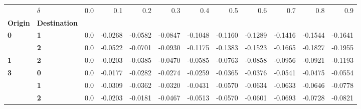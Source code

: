 \begin{tabular}{llrrrrrrrrrr}
\toprule
    & \textbf{\(\delta\)} &  0.0 &     0.1 &     0.2 &     0.3 &     0.4 &     0.5 &     0.6 &     0.7 &     0.8 &     0.9 \\
\textbf{Origin} & \textbf{Destination} &      &         &         &         &         &         &         &         &         &         \\
\midrule
\textbf{0} & \textbf{1} &  0.0 & -0.0268 & -0.0582 & -0.0847 & -0.1048 & -0.1160 & -0.1289 & -0.1416 & -0.1544 & -0.1641 \\
  & \textbf{2} &  0.0 & -0.0522 & -0.0701 & -0.0930 & -0.1175 & -0.1383 & -0.1523 & -0.1665 & -0.1827 & -0.1955 \\
\textbf{1} & \textbf{2} &  0.0 & -0.0203 & -0.0385 & -0.0470 & -0.0585 & -0.0763 & -0.0858 & -0.0956 & -0.0921 & -0.1193 \\
\textbf{3} & \textbf{0} &  0.0 & -0.0177 & -0.0282 & -0.0274 & -0.0259 & -0.0365 & -0.0376 & -0.0541 & -0.0475 & -0.0554 \\
  & \textbf{1} &  0.0 & -0.0309 & -0.0362 & -0.0320 & -0.0431 & -0.0570 & -0.0634 & -0.0633 & -0.0646 & -0.0778 \\
  & \textbf{2} &  0.0 & -0.0203 & -0.0181 & -0.0467 & -0.0513 & -0.0570 & -0.0601 & -0.0693 & -0.0728 & -0.0821 \\
\bottomrule
\end{tabular}
